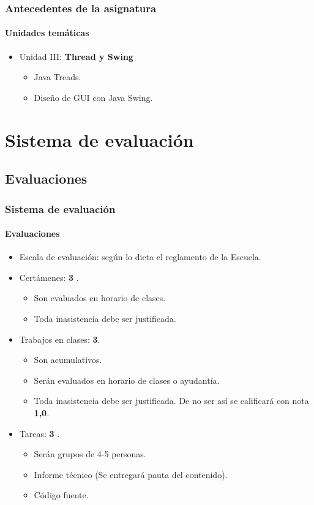 \documentclass{beamer}
\begin{document}
		\begin{frame}
			\frametitle{Antecedentes de la asignatura}
			\framesubtitle{Unidades tem\'aticas}

			\begin{itemize}
				\item Unidad III: \textbf{Thread y Swing}
				\begin{itemize}
					\item Java Treads.
				  \item Dise\~no de GUI con Java Swing.
				\end{itemize}
			\end{itemize}
		\end{frame}

	\section{Sistema de evaluaci\'on}

		\subsection{Evaluaciones}

		\begin{frame}
			\frametitle{Sistema de evaluaci\'on}
			\framesubtitle{Evaluaciones}

			\begin{itemize}
				\item Escala de evaluaci\'on: seg\'un lo dicta el reglamento de la Escuela.
				\item Cert\'amenes: \textbf{3} .
				\begin{itemize}
					\item Son evaluados en horario de clases.
					\item Toda inasistencia debe ser justificada.
				\end{itemize}
				\item Trabajos en clases: \textbf{3}.
				\begin{itemize}
					\item Son acumulativos.
					\item Ser\'an evaluados en horario de clases o ayudant\'ia.
					\item Toda inasistencia debe ser justificada. De no ser as\'i se calificar\'a con nota \textbf{1,0}.
				\end{itemize}
				\item Tareas: \textbf{3} .
				\begin{itemize}
				   \item Ser\'an grupos de 4-5 personas.
					\item Informe t\'ecnico (Se entregar\'a pauta del contenido).
					\item C\'odigo fuente.
				\end{itemize}
			\end{itemize}
		\end{frame}
\end{document}
